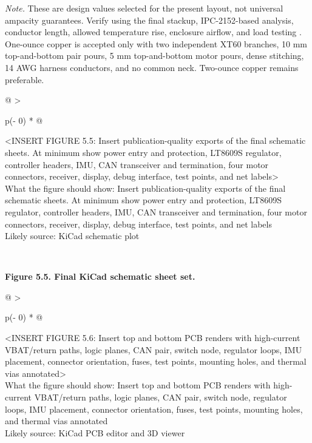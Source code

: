 \emph{Note.} These are design values selected for the present layout,
not universal ampacity guarantees. Verify using the final stackup,
IPC-2152-based analysis, conductor length, allowed temperature rise,
enclosure airflow, and load testing \cite{ipc2009ipc2152}. One-ounce copper is
accepted only with two independent XT60 branches, 10 mm top-and-bottom
pair pours, 5 mm top-and-bottom motor pours, dense stitching, 14 AWG
harness conductors, and no common neck. Two-ounce copper remains
preferable.

\begin{longtable}[]{@{}
  >{\raggedright\arraybackslash}p{(\columnwidth - 0\tabcolsep) * }@{}}
\toprule\noalign{}
\begin{minipage}[b]{\linewidth}\raggedright
\textless INSERT FIGURE 5.5: Insert publication-quality exports of the
final schematic sheets. At minimum show power entry and protection,
LT8609S regulator, controller headers, IMU, CAN transceiver and
termination, four motor connectors, receiver, display, debug interface,
test points, and net labels\textgreater{}\\
What the figure should show: Insert publication-quality exports of the
final schematic sheets. At minimum show power entry and protection,
LT8609S regulator, controller headers, IMU, CAN transceiver and
termination, four motor connectors, receiver, display, debug interface,
test points, and net labels\\
Likely source: KiCad schematic plot\strut
\end{minipage} \\
\midrule\noalign{}
\endhead
\bottomrule\noalign{}
\endlastfoot
\end{longtable}

\begin{center}\singlespacing
{}
\textbf{Figure 5.5. Final KiCad schematic sheet set.}
\end{center}

\begin{longtable}[]{@{}
  >{\raggedright\arraybackslash}p{(\columnwidth - 0\tabcolsep) * }@{}}
\toprule\noalign{}
\begin{minipage}[b]{\linewidth}\raggedright
\textless INSERT FIGURE 5.6: Insert top and bottom PCB renders with
high-current VBAT\slash{}return paths, logic planes, CAN pair, switch node,
regulator loops, IMU placement, connector orientation, fuses, test
points, mounting holes, and thermal vias annotated\textgreater{}\\
What the figure should show: Insert top and bottom PCB renders with
high-current VBAT\slash{}return paths, logic planes, CAN pair, switch node,
regulator loops, IMU placement, connector orientation, fuses, test
points, mounting holes, and thermal vias annotated\\
Likely source: KiCad PCB editor and 3D viewer\strut
\end{minipage} \\
\midrule\noalign{}
\endhead
\bottomrule\noalign{}
\endlastfoot
\end{longtable}

